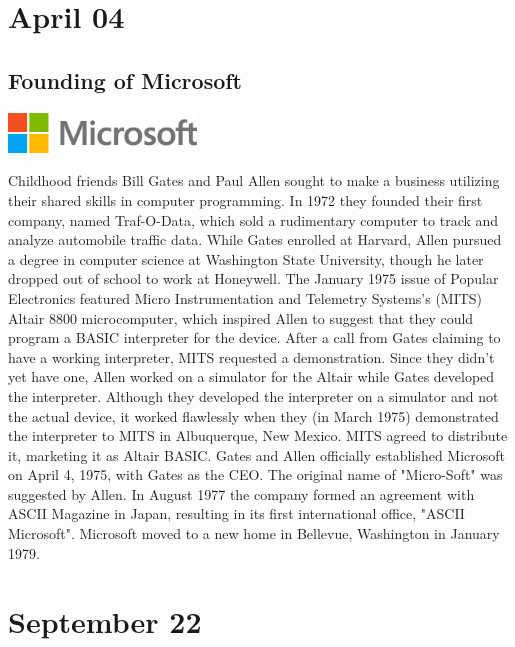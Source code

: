 \documentclass[11pt]{report}
\begin{document}
\section{April 04}
\subsection{Founding of Microsoft}
\vspace{2mm}\begin{center}\includegraphics[width=5cm]{./img/microsoftLogo.jpg}\end{center}
Childhood friends Bill Gates and Paul Allen sought to make a business utilizing their shared skills in computer programming. In 1972 they founded their first company, named Traf-O-Data, which sold a rudimentary computer to track and analyze automobile traffic data. While Gates enrolled at Harvard, Allen pursued a degree in computer science at Washington State University, though he later dropped out of school to work at Honeywell. The January 1975 issue of Popular Electronics featured Micro Instrumentation and Telemetry Systems's (MITS) Altair 8800 microcomputer, which inspired Allen to suggest that they could program a BASIC interpreter for the device. After a call from Gates claiming to have a working interpreter, MITS requested a demonstration. Since they didn't yet have one, Allen worked on a simulator for the Altair while Gates developed the interpreter. Although they developed the interpreter on a simulator and not the actual device, it worked flawlessly when they (in March 1975) demonstrated the interpreter to MITS in Albuquerque, New Mexico. MITS agreed to distribute it, marketing it as Altair BASIC. Gates and Allen officially established Microsoft on April 4, 1975, with Gates as the CEO. The original name of "Micro-Soft" was suggested by Allen. In August 1977 the company formed an agreement with ASCII Magazine in Japan, resulting in its first international office, "ASCII Microsoft". Microsoft moved to a new home in Bellevue, Washington in January 1979.
\section{September 22}
\end{document}
